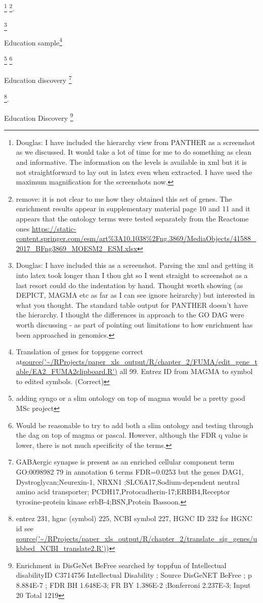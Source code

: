  
 
 \footnote{Douglas: I have included the hierarchy view from PANTHER as a screenshot as we discussed. It would take a lot of time for me to do something as clean and informative. The information on the levels is available in xml but it is not straightforward to lay out in latex even when extracted. I have used the maximum magnification for the screenshots now.}
 \footnote{remove: it is not clear to me how they obtained this set of genes. The enrichment results appear in supplementary material page 10 and 11 and it appears that the ontology terms were tested separately from the Reactome ones
\url{https://static-content.springer.com/esm/art\%3A10.1038\%2Fng.3869/MediaObjects/41588_2017_BFng3869_MOESM2_ESM.xlsx}}. 


 \footnote{Douglas: I have included this as a screenshot. Parsing the xml and getting it into latex took longer than I thou
 ght so I went straight to screenshot as a last resort could do the indentation by hand. Thought worth showing (as DEPICT, MAGMA etc as far as I can see ignore heirarchy) but interested in what you thought. The standard table output for PANTHER doesn't have the hierarchy. I thought the differences in approach to the GO DAG were worth discussing  - as part of pointing out limitations to how enrichment has been approached in genomics. }
 
 
 
 Education sample\footnote{Translation of genes for toppgene correct at\url{source('~/RProjects/paper_xls_output/R/chapter_2/FUMA/edit_gene_table/EA2_FUMA2clipboard.R')} all 99.
  Entrez ID from MAGMA to symbol to edited symbols. (Correct)}
 
  \footnote{adding syngo or a slim ontology on top of magma would be a pretty good MSc project}
\footnote{ Would be reasonable to try to add both a slim ontology and testing through the dag on top of magma or pascal. However, although the FDR q value is lower, there is not much specificity of the terms. }

Education discovery
\footnote{ GABAergic synapse is present as an enriched cellular component term GO:0098982 79 in annotation 6 terms FDR=0.0253 but the genes DAG1, Dystroglycan;Neurexin-1, NRXN1 ;SLC6A17,Sodium-dependent neutral amino acid transporter; PCDH17,Protocadherin-17;ERBB4,Receptor tyrosine-protein kinase erbB-4;BSN,Protein Bassoon.}

\footnote{entrez 231, hgnc (symbol) 225, NCBI symbol 227, HGNC ID 232 for HGNC id see \url{source('~/RProjects/paper_xls_output/R/chapter_2/translate_sig_genes/ukbbed_NCBI_translate2.R')})}.
 
 Education Discovery
 \footnote{Enrichment in DisGeNet BeFree searched by toppfun of Intellectual disabilityID C3714756 	Intellectual Disability ; Source	DisGeNET BeFree ; p 	8.884E-7 ; FDR BH	1.648E-3; FR BY 	1.386E-2 ;Bonferroni	2.237E-3; Input 	20 	Total 1219}       